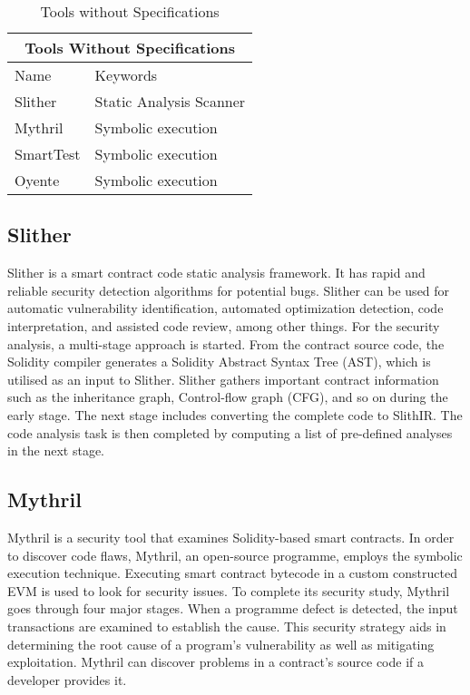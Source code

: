 \documentclass[a4paper,sigconf, language=french,
language=german, language=spanish, language=english]{acmart}
\begin{document}
\begin{table*}
  \caption{Tools without Specifications}
  \label{tab:ToolsWithoutSpec}
  \begin{tabular}{ |p{5cm}|p{5cm}|  }
  \hline
  \multicolumn{2}{|c|}{Tools Without Specifications } \\
  \hline
  Name & Keywords\\
  \hline
  Slither & Static Analysis Scanner\\
  \hline
  Mythril & Symbolic execution \\
  \hline
  SmartTest & Symbolic execution\\
  \hline
  Oyente  & Symbolic execution \\
  \hline
 \end{tabular}
\end{table*}
 

\subsection{Slither} Slither is a smart contract code static analysis framework.
It has rapid and reliable security detection algorithms for potential bugs.
Slither can be used for automatic vulnerability identification, automated optimization detection, code interpretation, and assisted code review, among other things.
For the security analysis, a multi-stage approach is started.
From the contract source code, the Solidity compiler generates a Solidity Abstract Syntax Tree (AST), which is utilised as an input to Slither.
Slither gathers important contract information such as the inheritance graph, Control-flow graph (CFG), and so on during the early stage.
The next stage includes converting the complete code to SlithIR.
The code analysis task is then completed by computing a list of pre-defined analyses in the next stage. 

\subsection{Mythril} 
Mythril is a security tool that examines Solidity-based smart contracts.
In order to discover code flaws, Mythril, an open-source programme, employs the symbolic execution technique.
Executing smart contract bytecode in a custom constructed EVM is used to look for security issues.
To complete its security study, Mythril goes through four major stages.
When a programme defect is detected, the input transactions are examined to establish the cause.
This security strategy aids in determining the root cause of a program's vulnerability as well as mitigating exploitation.
Mythril can discover problems in a contract's source code if a developer provides it. 
\end{document}
